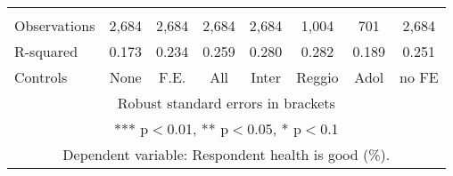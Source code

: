 \begin{tabular}{lccccccc}
 &  &  &  &  &  &  &  \\
Observations & 2,684 & 2,684 & 2,684 & 2,684 & 1,004 & 701 & 2,684 \\
R-squared & 0.173 & 0.234 & 0.259 & 0.280 & 0.282 & 0.189 & 0.251 \\
 Controls & None & F.E. & All & Inter & Reggio & Adol & no FE \\ \hline
\multicolumn{8}{c}{ Robust standard errors in brackets} \\
\multicolumn{8}{c}{ *** p$<$0.01, ** p$<$0.05, * p$<$0.1} \\
\multicolumn{8}{c}{ Dependent variable: Respondent health is good (\%).} \\
\end{tabular}
